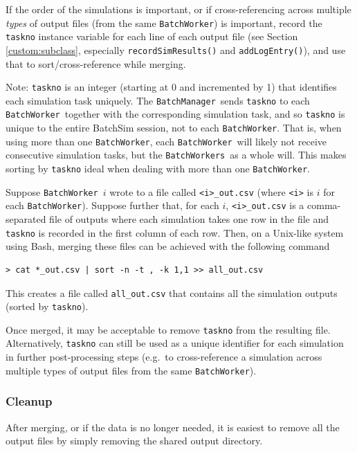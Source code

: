 \documentclass{article}
\newcommand{\BM}{{\tt BatchManager}}
\newcommand{\BW}{{\tt BatchWorker}}
\newcommand{\BWs}{{\tt BatchWorkers}}
\begin{document}
If the order of the simulations is important, or if cross-referencing across multiple \textit{types} of output files (from the same \BW) is important, record the {\tt taskno} instance variable for each line of each output file (see Section \ref{custom:subclass}, especially {\tt recordSimResults()} and {\tt addLogEntry()}), and use that to sort/cross-reference while merging.

\begin{sideblock}
Note: {\tt taskno} is an integer (starting at 0 and incremented by 1) that identifies each simulation task uniquely. The \BM\ sends {\tt taskno} to each \BW\ together with the corresponding simulation task, and so {\tt taskno} is unique to the entire BatchSim session, not to each \BW. That is, when using more than one \BW, each \BW\ will likely not receive consecutive simulation tasks, but the \BWs\ as a whole will. This makes sorting by {\tt taskno} ideal when dealing with more than one \BW.
\end{sideblock}

Suppose \BW\ $i$ wrote to a file called {\tt <i>\_out.csv} (where {\tt <i>} is $i$ for each \BW). Suppose further that, for each $i$, {\tt <i>\_out.csv} is a comma-separated file of outputs where each simulation takes one row in the file and {\tt taskno} is recorded in the first column of each row. Then, on a Unix-like system using Bash, merging these files can be achieved with the following command

\begin{lstlisting}[]
  > cat *_out.csv | sort -n -t , -k 1,1 >> all_out.csv
\end{lstlisting}

This creates a file called {\tt all\_out.csv} that contains all the simulation outputs (sorted by {\tt taskno}).

Once merged, it may be acceptable to remove {\tt taskno} from the resulting file. Alternatively, {\tt taskno} can still be used as a unique identifier for each simulation in further post-processing steps (e.g.\ to cross-reference a simulation across multiple types of output files from the same \BW).

\subsubsection{Cleanup}

After merging, or if the data is no longer needed, it is easiest to remove all the output files by simply removing the shared output directory.
\end{document}
